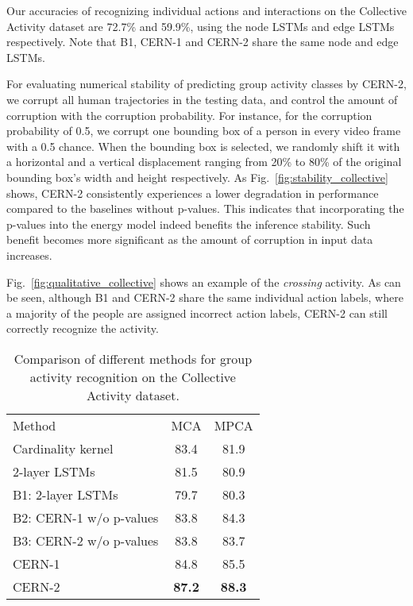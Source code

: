 \documentclass[10pt,twocolumn,letterpaper]{article}
\begin{document}
Our accuracies of recognizing individual actions and interactions on the Collective Activity dataset are 72.7\% and 59.9\%, using the node LSTMs and edge LSTMs respectively. Note that B1, CERN-1 and CERN-2 share the same node and edge LSTMs. %




For evaluating numerical stability of predicting group activity classes by CERN-2, we corrupt all human trajectories in the testing data, and control the amount of corruption with the corruption probability. For instance, for the corruption probability of 0.5, we corrupt one bounding box of a person in every video frame with a 0.5 chance. When the bounding box is selected, we randomly shift it with a horizontal and a vertical displacement ranging from 20\% to 80\% of the original bounding box's width and height respectively. As Fig.~\ref{fig:stability_collective} shows, CERN-2 consistently experiences a lower degradation in performance compared to the baselines without p-values. This indicates that incorporating the p-values into the energy model indeed benefits the inference stability. Such benefit becomes more significant as the amount of corruption in input data increases.

Fig.~\ref{fig:qualitative_collective} shows an example of the \textit{crossing} activity. As can be seen, although B1 and CERN-2 share the same individual action labels, where a majority of the people are assigned incorrect action labels, CERN-2 can still correctly recognize the activity.

\begin{table}
\centering
\begin{tabular}{|l|c|c|}
\hline
Method & MCA & MPCA\\ \hhline{===}
Cardinality kernel \cite{Hajimirsadeghi2015} 	&	 83.4 	&	81.9\\ \hhline{===}
2-layer LSTMs \cite{Ibrahim2016}			&	 81.5 	&	80.9\\ \hline
B1: 2-layer LSTMs 						&	 79.7		&	80.3\\ \hline
B2: CERN-1 w/o p-values					&	 83.8		& 	84.3\\ \hline
B3: CERN-2 w/o p-values					&	 83.8		& 	83.7\\ \hline
CERN-1								&	 84.8		&	85.5\\ \hline
CERN-2								& {\bf 87.2}	&{\bf 88.3}\\ \hline
\end{tabular}
\caption{Comparison of different methods for group activity recognition on the Collective Activity dataset.}
\label{table:collective}
\end{table}
\end{document}
